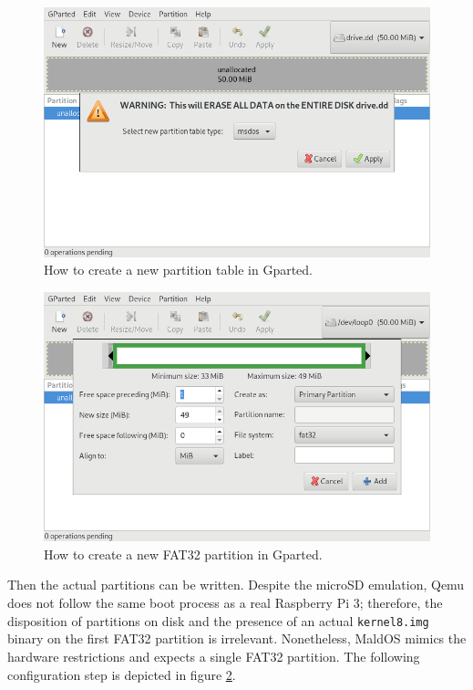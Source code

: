 \documentclass[12pt,a4paper,openright,twoside]{report}
\begin{document}
 \begin{figure}[t]
    \begin{center}
 \includegraphics[scale=0.3]{images/tesi18.png}
 \caption[Gparted Partition Table]{ How to create a new partition table in Gparted.}
 \label{fig:gparted1}
    \end{center}
 \end{figure}

 \begin{figure}[h]
    \begin{center}
 \includegraphics[scale=0.3]{images/tesi19.png}
 \caption[Gparted FAT32 Partition]{ How to create a new FAT32 partition in Gparted.}
 \label{fig:gparted2}
    \end{center}
 \end{figure}


Then the actual partitions can be written. Despite the microSD emulation, Qemu
does not follow the same boot process as a real Raspberry Pi 3; therefore, the 
disposition of partitions on disk and the presence of an actual {\tt kernel8.img}
binary on the first FAT32 partition is irrelevant. Nonetheless, MaldOS mimics the hardware 
restrictions and expects a single FAT32 partition. The following configuration
step is depicted in figure \ref{fig:gparted2}.
\end{document}
